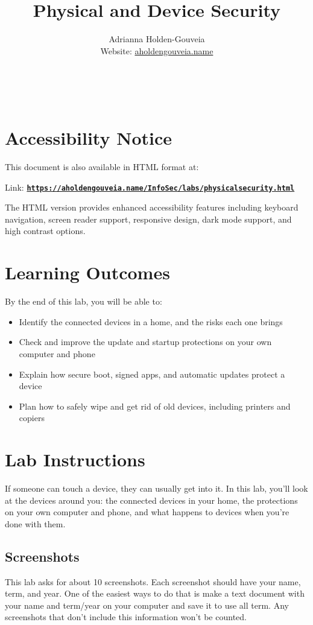 \documentclass[12pt]{article}
\title{Physical and Device Security}
\author{
        Adrianna Holden-Gouveia \\
        Website: \href{https://aholdengouveia.name}{aholdengouveia.name}\\ 
        \date{\vspace{-5ex}}
        \faGithub {: aholdengouveia} \\
        \faTwitter {: aholdengouveia} \\
        }
\begin{document}
    

\maketitle

\section*{Accessibility Notice}
This document is also available in HTML format at:

Link: \href{https://aholdengouveia.name/InfoSec/labs/physicalsecurity.html}{\textbf{\nolinkurl{https://aholdengouveia.name/InfoSec/labs/physicalsecurity.html}}}

The HTML version provides enhanced accessibility features including keyboard navigation, screen reader support, responsive design, dark mode support, and high contrast options.

\section*{Learning Outcomes}
By the end of this lab, you will be able to:
\begin{itemize}
    \item Identify the connected devices in a home, and the risks each one brings
    \item Check and improve the update and startup protections on your own computer and phone
    \item Explain how secure boot, signed apps, and automatic updates protect a device
    \item Plan how to safely wipe and get rid of old devices, including printers and copiers
\end{itemize}

\section*{Lab Instructions}
If someone can touch a device, they can usually get into it. In this lab, you'll look at the devices around you: the connected devices in your home, the protections on your own computer and phone, and what happens to devices when you're done with them.

\subsection*{Screenshots}
This lab asks for about 10 screenshots. Each screenshot should have your name, term, and year.  One of the easiest ways to do that is make a text document with your name and term/year on your computer and save it to use all term. Any screenshots that don't include this information won't be counted.
\end{document}
